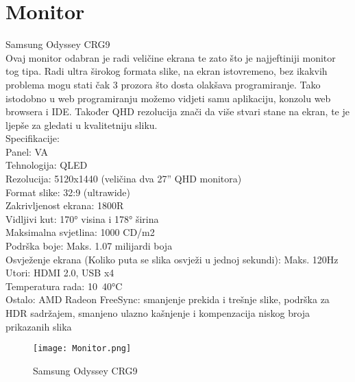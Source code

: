 \documentclass{report}
\begin{document}
\chapter{Monitor}
Samsung Odyssey CRG9
\\Ovaj monitor odabran je radi veličine ekrana te zato što je najjeftiniji monitor tog tipa. Radi ultra širokog formata slike, na ekran istovremeno, bez ikakvih problema mogu stati čak 3 prozora što dosta olakšava programiranje. Tako istodobno u web programiranju možemo vidjeti samu aplikaciju, konzolu web browsera i IDE. Također QHD rezolucija znači da više stvari stane na ekran, te je ljepše za gledati u kvalitetniju sliku.
\\Specifikacije:
\\Panel: VA
\\Tehnologija: QLED
\\Rezolucija: 5120x1440 (veličina dva 27” QHD monitora)
\\Format slike: 32:9 (ultrawide)
\\Zakrivljenost ekrana: 1800R
\\Vidljivi kut: 170° visina i 178° širina
\\Maksimalna svjetlina: 1000 CD/m2
\\Podrška boje: Maks. 1.07 milijardi boja
\\Osvježenje ekrana (Koliko puta se slika osvježi u jednoj sekundi): Maks. 120Hz
\\Utori: HDMI 2.0, USB x4
\\Temperatura rada: 10~40°C
\\Ostalo:
AMD Radeon FreeSync: smanjenje prekida i trešnje slike, podrška za HDR sadržajem, smanjeno ulazno kašnjenje i kompenzacija niskog broja prikazanih slika
\begin{figure}[h]
\texttt{[image: Monitor.png]}
\caption{Samsung Odyssey CRG9}
\end{figure}
\end{document}
